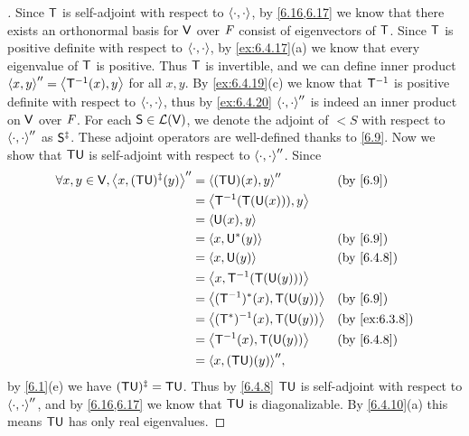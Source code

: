 \begin{proof}[]
  Since \(\mathsf{T}\) is self-adjoint with respect to \(\left\langle\cdot, \cdot\right\rangle\), by \cref{6.16,6.17} we know that there exists an orthonormal basis for \(\mathsf{V}\) over \(\mathit{F}\) consist of eigenvectors of \(\mathsf{T}\).
  Since \(\mathsf{T}\) is positive definite with respect to \(\left\langle\cdot, \cdot\right\rangle\), by \cref{ex:6.4.17}(a) we know that every eigenvalue of \(\mathsf{T}\) is positive.
  Thus \(\mathsf{T}\) is invertible, and we can define inner product \(\left\langle x, y\right\rangle'' = \left\langle\mathsf{T}^{-1}(x), y\right\rangle\) for all \(x, y\).
  By \cref{ex:6.4.19}(c) we know that \(\mathsf{T}^{-1}\) is positive definite with respect to \(\left\langle\cdot, \cdot\right\rangle\), thus by \cref{ex:6.4.20} \(\left\langle\cdot, \cdot\right\rangle''\) is indeed an inner product on \(\mathsf{V}\) over \(\mathit{F}\).
  For each \(\mathsf{S} \in \mathcal{L}(\mathsf{V})\), we denote the adjoint of \(\lt{S}\) with respect to \(\left\langle\cdot, \cdot\right\rangle''\) as \(\mathsf{S}^{\ddag}\).
  These adjoint operators are well-defined thanks to \cref{6.9}.
  Now we show that \(\mathsf{T} \mathsf{U}\) is self-adjoint with respect to \(\left\langle\cdot, \cdot\right\rangle''\).
  Since
  \begin{align*}
    \forall x, y \in \V, \inn{x, (\T \U)^{\ddag}(y)}'' & = \inn{(\T \U)(x), y}''           &  & \text{(by \cref{6.9})}      \\
                                                       & = \inn{\T^{-1}(\T(\U(x))), y}                                      \\
                                                       & = \inn{\U(x), y}                                                   \\
                                                       & = \inn{x, \U^*(y)}                &  & \text{(by \cref{6.9})}      \\
                                                       & = \inn{x, \U(y)}                  &  & \text{(by \cref{6.4.8})}    \\
                                                       & = \inn{x, \T^{-1}(\T(\U(y)))}                                      \\
                                                       & = \inn{(\T^{-1})^*(x), \T(\U(y))} &  & \text{(by \cref{6.9})}      \\
                                                       & = \inn{(\T^*)^{-1}(x), \T(\U(y))} &  & \text{(by \cref{ex:6.3.8})} \\
                                                       & = \inn{\T^{-1}(x), \T(\U(y))}     &  & \text{(by \cref{6.4.8})}    \\
                                                       & = \inn{x, (\T \U)(y)}'',
  \end{align*}
  by \cref{6.1}(e) we have \((\mathsf{T} \mathsf{U})^{\ddag} = \mathsf{T} \mathsf{U}\).
  Thus by \cref{6.4.8} \(\mathsf{T} \mathsf{U}\) is self-adjoint with respect to \(\left\langle\cdot, \cdot\right\rangle''\), and by \cref{6.16,6.17} we know that \(\mathsf{T} \mathsf{U}\) is diagonalizable.
  By \cref{6.4.10}(a) this means \(\mathsf{T} \mathsf{U}\) has only real eigenvalues.
\end{proof}


